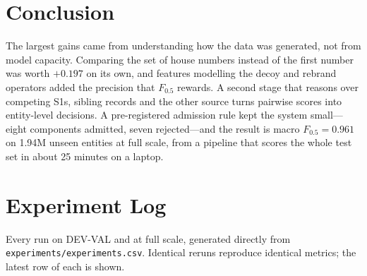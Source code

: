 \documentclass[10pt]{article}
\newcommand{\Fh}{F_{0.5}}
\begin{document}
\section{Conclusion}
The largest gains came from understanding how the data was generated, not from model capacity. Comparing the set of house numbers instead of the first number was worth $+0.197$ on its own, and features modelling the decoy and rebrand operators added the precision that $\Fh$ rewards. A second stage that reasons over competing S1s, sibling records and the other source turns pairwise scores into entity-level decisions. A pre-registered admission rule kept the system small---eight components admitted, seven rejected---and the result is macro $\Fh = 0.961$ on 1.94M unseen entities at full scale, from a pipeline that scores the whole test set in about 25 minutes on a laptop.

\appendix
\section{Experiment Log}
\label{app:log}
Every run on DEV-VAL and at full scale, generated directly from \texttt{experiments/experiments.csv}. Identical reruns reproduce identical metrics; the latest row of each is shown.
\end{document}
